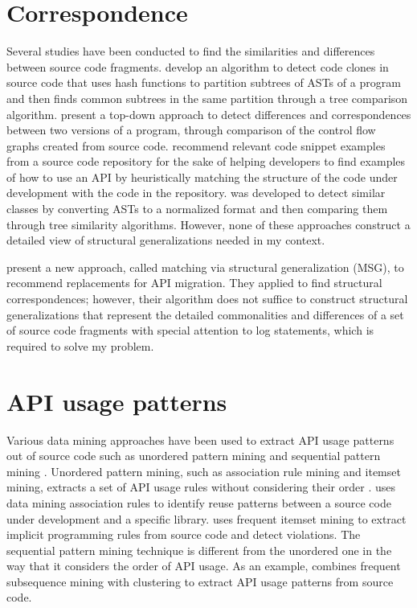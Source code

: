 \section{Correspondence}  \label{ch7-corr}
Several studies have been conducted to find the similarities and differences between source code fragments. \citet{baxter1998clone} develop an algorithm to detect code clones in source code that uses hash functions to partition subtrees of ASTs of a program and then finds common subtrees in the same partition through a tree comparison algorithm. \citet{apiwattanapong2004differencing} present a top-down approach to detect differences and correspondences between two versions of a  program, through comparison of the control flow graphs created from source code. \citet{2006:tse:holmes} recommend relevant code snippet examples from a source code repository for the sake of helping developers to find examples of how to use an API by heuristically matching the structure of the code under development with the code in the repository.  \cite{sager2006detecting} was developed to detect similar  classes by converting ASTs to a normalized format and then comparing them through tree similarity algorithms. However, none of these approaches construct a detailed view of structural generalizations needed in my context.



\citet{2014:uofc:cossette} present a new approach, called matching via structural generalization (MSG), to recommend replacements for API migration. They applied  to find structural correspondences; however, their algorithm does not suffice to construct structural generalizations that represent the detailed commonalities and differences of a set of source code fragments with special attention to log statements, which is required to solve my problem.

\section{API usage patterns}  \label{ch7-usage-patterns}
Various data mining approaches have been used to extract API usage patterns out of source code such as unordered pattern mining and sequential pattern mining \cite{robillard2013automated}. Unordered pattern mining, such as association rule mining and itemset mining, extracts a set of API usage rules without considering their order \cite{agrawal1994fast}.  \cite{2000:icse:michail} uses data mining association rules to identify reuse patterns between a source code under development and a specific library.  \cite{li2005pr} uses frequent itemset mining to extract implicit programming rules from source code and detect violations. The sequential pattern mining technique is different from the unordered one in the way that it considers the order of API usage. As an example,  \cite{2006:msr:xie} combines frequent subsequence mining with clustering to extract API usage patterns from source code.

